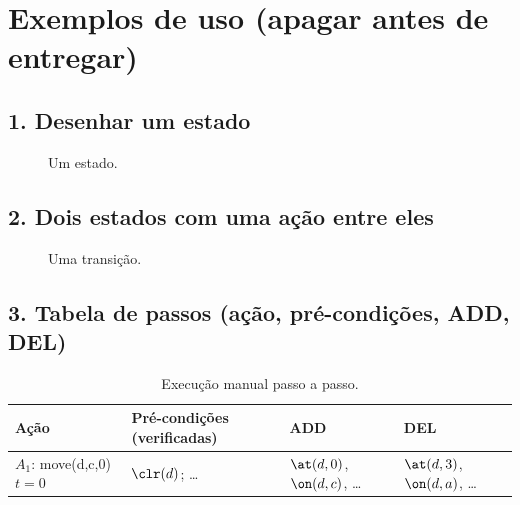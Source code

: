 \newpage
\section*{Exemplos de uso (apagar antes de entregar)}

\subsection*{1. Desenhar um estado}
\begin{figure}[H]
\centering
{}
\caption{Um estado.}
\end{figure}

\subsection*{2. Dois estados com uma ação entre eles}
\begin{figure}[H]
\centering
{}
\caption{Uma transição.}
\end{figure}

\subsection*{3. Tabela de passos (ação, pré-condições, ADD, DEL)}
\begin{table}[H]
\centering\small
\renewcommand{\arraystretch}{1.25}
\begin{tabularx}{\textwidth}{@{}p{2.3cm} X X X@{}}
\toprule
Ação & Pré-condições (verificadas) & ADD & DEL\\
\midrule
$A_1$: move(d,c,0)\newline $t=0$ &
$\clr(d)$; \dots &
$\at(d,0)$, $\on(d,c)$, \dots &
$\at(d,3)$, $\on(d,a)$, \dots\\
\bottomrule
\end{tabularx}
\caption{Execução manual passo a passo.}
\end{table}

